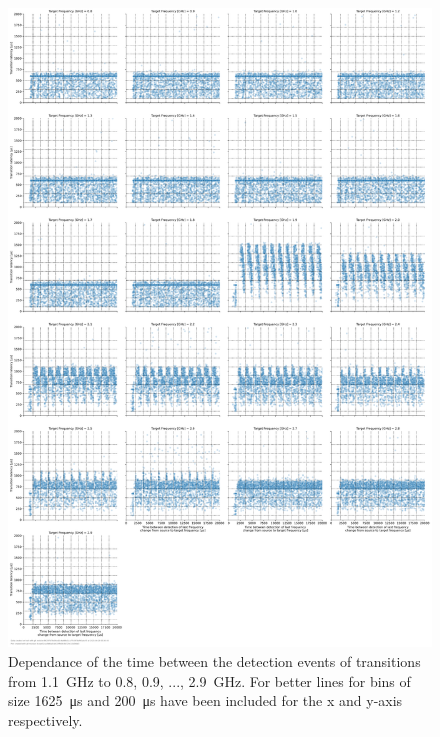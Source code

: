 \begin{figure}[]
    \centering
    \includegraphics[width=\columnwidth]{fig/ftalat/ftalat_scatter_wait_transition_latency_hati_source_1.1.pdf}
    \caption{Dependance of the time between the detection events of transitions from \SI{1.1}{\GHz} to \SI{0.8}{}, \SI{0.9}{}, ..., \SI{2.9}{\GHz}. For better lines for bins of size \SI{1625}{\us} and \SI{200}{\us} have been included for the x and y-axis respectively.}
\end{figure}
